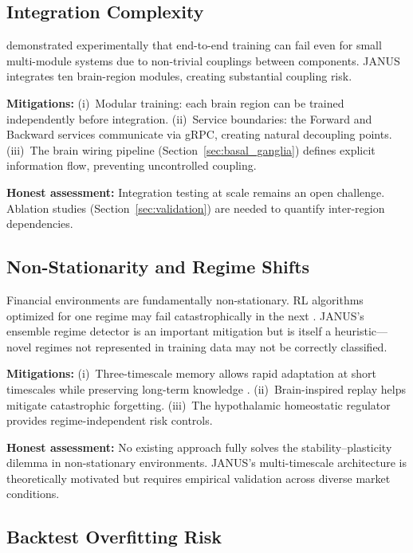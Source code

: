 \documentclass[12pt, a4paper]{article}
\begin{document}
\subsection{Integration Complexity}

\citet{glasmachers2017limits} demonstrated experimentally that end-to-end training can fail even for small multi-module systems due to non-trivial couplings between components. JANUS integrates ten brain-region modules, creating substantial coupling risk.

\textbf{Mitigations:} (i)~Modular training: each brain region can be trained independently before integration. (ii)~Service boundaries: the Forward and Backward services communicate via gRPC, creating natural decoupling points. (iii)~The brain wiring pipeline (Section~\ref{sec:basal_ganglia}) defines explicit information flow, preventing uncontrolled coupling.

\textbf{Honest assessment:} Integration testing at scale remains an open challenge. Ablation studies (Section~\ref{sec:validation}) are needed to quantify inter-region dependencies.

\subsection{Non-Stationarity and Regime Shifts}

Financial environments are fundamentally non-stationary. RL algorithms optimized for one regime may fail catastrophically in the next \citep{padakandla2020nonstationary}. JANUS's ensemble regime detector is an important mitigation but is itself a heuristic---novel regimes not represented in training data may not be correctly classified.

\textbf{Mitigations:} (i)~Three-timescale memory allows rapid adaptation at short timescales while preserving long-term knowledge \citep{masset2025multitimescale}. (ii)~Brain-inspired replay \citep{vandeven2020braininspired} helps mitigate catastrophic forgetting. (iii)~The hypothalamic homeostatic regulator provides regime-independent risk controls.

\textbf{Honest assessment:} No existing approach fully solves the stability--plasticity dilemma in non-stationary environments. JANUS's multi-timescale architecture is theoretically motivated but requires empirical validation across diverse market conditions.

\subsection{Backtest Overfitting Risk}
\end{document}
